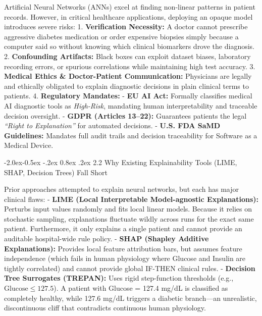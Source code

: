 \documentclass[10pt,a4paper]{article}
\makeatletter
\renewcommand\subsubsection{\@startsection{subsubsection}{3}{\z@}%
                                     {-2.0ex\@plus -0.5ex \@minus -.2ex}%
                                     {0.8ex \@plus .2ex}%
                                     {\normalfont\normalsize\bfseries\color{accent}}}
\makeatother
\begin{document}
Artificial Neural Networks (ANNs) excel at finding non-linear patterns
in patient records. However, in critical healthcare applications,
deploying an opaque model introduces severe risks: 1.
\textbf{Verification Necessity:} A doctor cannot prescribe aggressive
diabetes medication or order expensive biopsies simply because a
computer said so without knowing which clinical biomarkers drove the
diagnosis. 2. \textbf{Confounding Artifacts:} Black boxes can exploit
dataset biases, laboratory recording errors, or spurious correlations
while maintaining high test accuracy. 3. \textbf{Medical Ethics \&
Doctor-Patient Communication:} Physicians are legally and ethically
obligated to explain diagnostic decisions in plain clinical terms to
patients. 4. \textbf{Regulatory Mandates:} - \textbf{EU AI Act:}
Formally classifies medical AI diagnostic tools as \emph{High-Risk},
mandating human interpretability and traceable decision oversight. -
\textbf{GDPR (Articles 13--22):} Guarantees patients the legal
\emph{``Right to Explanation''} for automated decisions. - \textbf{U.S.
FDA SaMD Guidelines:} Mandates full audit trails and decision
traceability for Software as a Medical Device.

\subsubsection{2.2 Why Existing Explainability Tools (LIME, SHAP,
Decision Trees) Fall
Short}\label{why-existing-explainability-tools-lime-shap-decision-trees-fall-short}

Prior approaches attempted to explain neural networks, but each has
major clinical flaws: - \textbf{LIME (Local Interpretable Model-agnostic
Explanations):} Perturbs input values randomly and fits local linear
models. Because it relies on stochastic sampling, explanations fluctuate
wildly across runs for the exact same patient. Furthermore, it only
explains a single patient and cannot provide an auditable hospital-wide
rule policy. - \textbf{SHAP (Shapley Additive Explanations):} Provides
local feature attribution bars, but assumes feature independence (which
fails in human physiology where Glucose and Insulin are tightly
correlated) and cannot provide global IF-THEN clinical rules. -
\textbf{Decision Tree Surrogates (TREPAN):} Uses rigid step-function
thresholds (e.g., \(\text{Glucose} \le 127.5\)). A patient with Glucose
= 127.4 mg/dL is classified as completely healthy, while 127.6 mg/dL
triggers a diabetic branch---an unrealistic, discontinuous cliff that
contradicts continuous human physiology.
\end{document}
